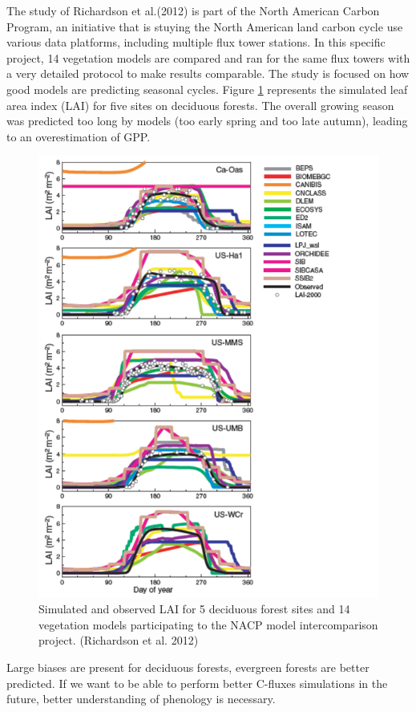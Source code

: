 \documentclass[12pt,oneside]{book}
\begin{document}
The study of Richardson et al.(2012) is part of the North American
Carbon Program, an initiative that is stuying the North American land
carbon cycle use various data platforms, including multiple flux tower
stations. In this specific project, 14 vegetation models are compared
and ran for the same flux towers with a very detailed protocol to make
results comparable. The study is focused on how good models are
predicting seasonal cycles. Figure \ref{fig:f49} represents the
simulated leaf area index (LAI) for five sites on deciduous forests. The
overall growing season was predicted too long by models (too early
spring and too late autumn), leading to an overestimation of GPP.

\begin{figure}

{\centering \includegraphics[width=0.8\linewidth]{figures/chap4/f47_LAI_richardson} 

}

\caption{Simulated and observed LAI for 5 deciduous forest sites and 14 vegetation models participating to the NACP model intercomparison project. (Richardson et al. 2012)}\label{fig:f49}
\end{figure}

Large biases are present for deciduous forests, evergreen forests are
better predicted. If we want to be able to perform better C-fluxes
simulations in the future, better understanding of phenology is
necessary.
\end{document}
